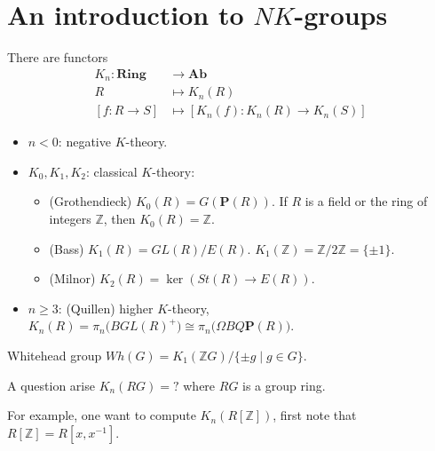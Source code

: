 \chapter{An introduction to $NK$-groups}
There are functors  
\begin{align*}
K_n \colon \mathbf{Ring} &\longrightarrow \mathbf{Ab}\\
R &\mapsto K_n(R)\\
[f:R\rightarrow S] &\mapsto [K_n(f):K_n(R)\rightarrow K_n(S)]
\end{align*}
\begin{itemize}
	\item $n<0$: negative $K$-theory.
	\item $K_0, K_1, K_2$: classical $K$-theory:
		\begin{itemize}
			\item (Grothendieck) $K_0(R)=G(\mathbf{P}(R))$. If $R$ is a field or the ring of integers $\mathbb{Z}$, then $K_0(R)=\mathbb{Z}$.
			\item (Bass) $K_1(R)=GL(R)/E(R)$. $K_1(\mathbb{Z})=\mathbb{Z}/2\mathbb{Z}=\{\pm 1\}$.
			\item (Milnor) $K_2(R)=\ker(St(R)\longrightarrow E(R))$.
		\end{itemize}
	\item $n\geq 3$: (Quillen) higher $K$-theory, $K_n(R)=\pi_n\big(BGL(R)^+\big) \cong \pi_n\big(\Omega BQ\mathbf{P}(R)\big)$.
\end{itemize}
\begin{definition}
	Whitehead group $Wh(G)=K_1(\mathbb{Z}G)/\{\pm g \mid g\in G\}$.
\end{definition}
A question arise $K_n(RG)=?$ where $RG$ is a group ring.

For example, one want to compute $K_n(R[\mathbb{Z}])$, first note that $R[\mathbb{Z}]=R[x,x^{-1}]$.
